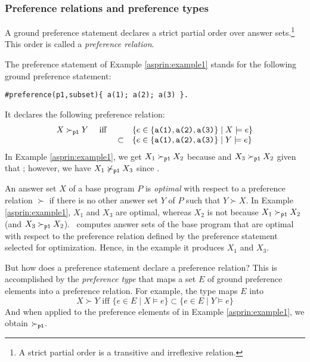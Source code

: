 \subsubsection{Preference relations and preference types}

A ground preference statement declares a 
strict partial order over answer sets.\footnote{A strict partial order is a transitive and irreflexive relation.}
This order is called a \emph{preference relation}.
\begin{example}
The preference statement of Example \ref{asprin:example1} stands for the following ground preference statement:
\begin{lstlisting}[numbers=none]
#preference(p1,subset){ a(1); a(2); a(3) }.
\end{lstlisting}
It declares the following preference relation:
\[
\begin{array}{cccl}
X \succ_{\texttt{p1}} Y & \text{ iff } &         & \{e\in \{\texttt{a(1)},\texttt{a(2)},\texttt{a(3)}\} \mid X\models e\} \\ 
                      &              & \subset & \{e\in \{\texttt{a(1)},\texttt{a(2)},\texttt{a(3)}\} \mid Y\models e\}
\end{array}
\]
In Example \ref{asprin:example1}, 
we get
$X_1\succ_{\texttt{p1}}X_2$ because 
and $X_3\succ_{\texttt{p1}}X_2$ given that ;
however, we have $X_1\not\succ_{\texttt{p1}}X_3$ since . 
\end{example}
An answer set $X$ of a base program $P$ is \emph{optimal} with respect to a preference relation $\succ$
if there is no other answer set $Y$ of $P$ such that $Y \succ X$.
In Example \ref{asprin:example1}, 
$X_1$ and $X_3$ are optimal,
whereas $X_2$ is not because $X_1 \succ_{\texttt{p1}} X_2$ (and $X_3 \succ_{\texttt{p1}} X_2$).
\asprin\ computes answer sets of the base program
that are optimal with respect to the preference relation 
defined by the preference statement selected for optimization.
Hence, in the example it produces $X_1$ and $X_3$.

But how does a preference statement declare a preference relation?
This is accomplished by the \emph{preference type}
that maps a set $E$ of ground preference elements into a preference relation.
For example, the type  maps $E$ into
\[
X \succ Y \text{ iff } \{e\in E\mid X\models e\}\subset\{e\in E\mid Y\models e\}
\]
And when applied to the preference elements of  in Example \ref{asprin:example1}, we obtain $\succ_{\texttt{p1}}$.

